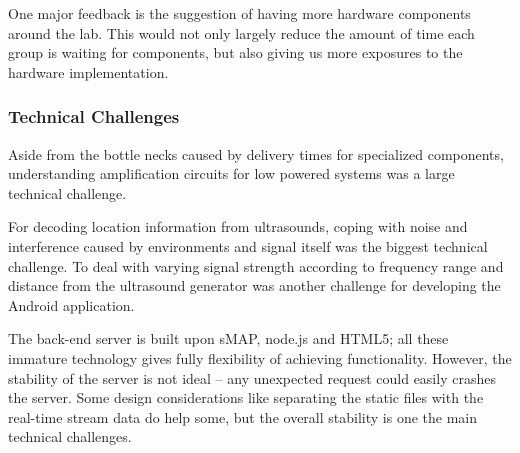 One major feedback is the suggestion of having more hardware components around the lab. This would not only largely reduce the amount of time each group is waiting for components, but also giving us more exposures to the hardware implementation.

\subsubsection{Technical Challenges}
\label{sec:technical-challenges}
Aside from the bottle necks caused by delivery times for specialized components, understanding amplification circuits for low powered systems was a large technical challenge.

For decoding location information from ultrasounds, coping with noise and interference caused by environments and signal itself was the biggest technical challenge. To deal with varying signal strength according to frequency range and distance from the ultrasound generator was another challenge for developing the Android application.

The back-end server is built upon sMAP, node.js and HTML5; all these immature technology gives fully flexibility of achieving functionality. However, the stability of the server is not ideal -- any unexpected request could easily crashes the server. Some design considerations like separating the static files with the real-time stream data do help some, but the overall stability is one the main technical challenges.

